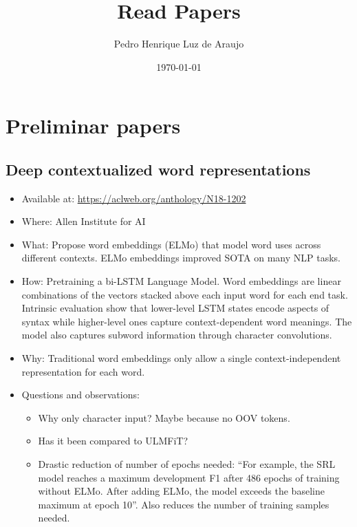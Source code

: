 \documentclass[a4paper,12pt]{article}
\begin{document}
\title{Read Papers}
\author{Pedro Henrique Luz de Araujo}
\date{\today}
\maketitle
\tableofcontents

\section{Preliminar papers}
\subsection{Deep contextualized word representations}
\begin{itemize}
    \item Available at: \url{https://aclweb.org/anthology/N18-1202}~\cite{elmo}
    \item Where: Allen Institute for AI
    \item What: Propose word embeddings (ELMo) that model word uses across different contexts. ELMo embeddings improved SOTA on many NLP tasks.
    \item How: Pretraining a bi-LSTM Language Model. Word embeddings are linear combinations of the vectors stacked above each input word for each end task. Intrinsic evaluation show that lower-level LSTM states encode aspects of syntax while higher-level ones capture context-dependent word meanings. The model also captures subword information through character convolutions.
    \item Why: Traditional word embeddings only allow a single context-independent representation for each word.
    \item Questions and observations:
        \begin{itemize}
            \item Why only character input? Maybe because no OOV tokens.
            \item Has it been compared to ULMFiT?
            \item Drastic reduction of number of epochs needed: ``For example,
            the SRL model reaches a maximum development
            F1 after 486 epochs of training without
            ELMo. After adding ELMo, the model exceeds
            the baseline maximum at epoch 10''. Also reduces the number of training samples needed.
        \end{itemize}
\end{itemize}
\end{document}
